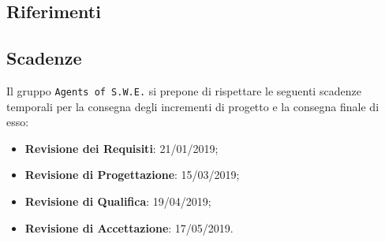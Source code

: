 \subsection{Riferimenti}

\newpage

\subsection{Scadenze}
Il gruppo \texttt{Agents of S.W.E.} si prepone di rispettare le seguenti scadenze temporali per la consegna degli incrementi di progetto e la consegna finale di esso:
\begin{itemize}
\item \textbf{Revisione dei Requisiti}: 21/01/2019;
\item \textbf{Revisione di Progettazione}: 15/03/2019;
\item \textbf{Revisione di Qualifica}: 19/04/2019;
\item \textbf{Revisione di Accettazione}: 17/05/2019. 
\end{itemize} 

